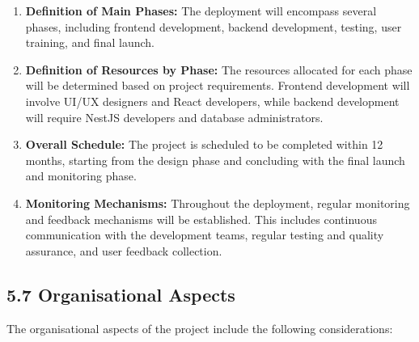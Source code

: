 \begin{enumerate}
    \item \textbf{Definition of Main Phases:} The deployment will encompass several phases, including frontend development, backend development, testing, user training, and final launch.

    \item \textbf{Definition of Resources by Phase:} The resources allocated for each phase will be determined based on project requirements. Frontend development will involve UI/UX designers and React developers, while backend development will require NestJS developers and database administrators.

    \item \textbf{Overall Schedule:} The project is scheduled to be completed within 12 months, starting from the design phase and concluding with the final launch and monitoring phase.

    \item \textbf{Monitoring Mechanisms:} Throughout the deployment, regular monitoring and feedback mechanisms will be established. This includes continuous communication with the development teams, regular testing and quality assurance, and user feedback collection.
\end{enumerate}



\subsection{5.7 Organisational Aspects}

The organisational aspects of the project include the following considerations:

